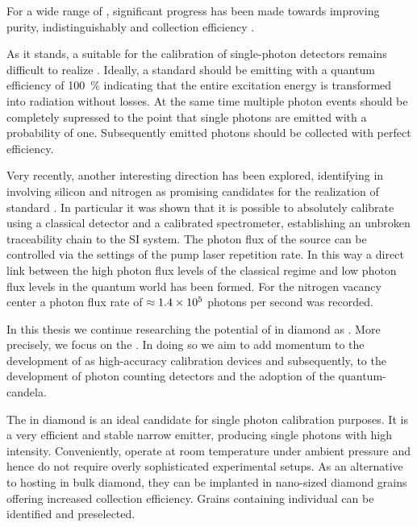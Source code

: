 	For a wide range of \spss, significant progress has been made towards improving purity, indistinguishably and collection efficiency \cite{lee2011planar, chen201199, ates2013improving, PhysRevLett.116.020401, somaschi2016near}.

	As it stands, a \sps suitable for the calibration of single-photon detectors remains difficult to realize \cite{Vaigu2017}. Ideally, a standard \sps should be emitting with a quantum efficiency of \SI{100}{\percent} indicating that the entire excitation energy is transformed into radiation without losses. At the same time multiple photon events should be completely supressed to the point that single photons are emitted with a probability of one. Subsequently emitted photons should be collected with perfect efficiency.

	Very recently, another interesting direction has been explored, identifying \ccs in \nds involving silicon \cite{Neu2012a, Neu2012b} and nitrogen \cite{doherty2013nitrogen} as promising candidates for the realization of standard \spss \cite{Rodiek2017,Vaigu2017}. In particular it was shown that it is possible to absolutely calibrate \spss using a classical detector and a calibrated spectrometer, establishing an unbroken traceability chain to the SI system. The photon flux of the source can be controlled via the settings of the pump laser repetition rate. In this way a direct link between the high photon flux levels of the classical regime and low photon flux levels in the quantum world has been formed. For the nitrogen vacancy center a photon flux rate of $\approx \num{1.4d5}$ photons per second was recorded.

	In this thesis we continue researching the potential of \ccs in diamond as \spss. More precisely, we focus on the \sivc. In doing so we aim to add momentum to the development of \sps as high-accuracy calibration devices and subsequently, to the development of photon counting detectors and the adoption of the quantum-candela.

	The \siv in diamond is an ideal candidate for single photon calibration purposes. It is a very efficient and stable narrow \lw emitter, producing single photons with high intensity. Conveniently, \sivs operate at room temperature under ambient pressure and hence do not require overly sophisticated experimental setups. As an alternative to hosting \sivs in bulk diamond, they can be implanted in nano-sized diamond grains offering increased collection efficiency. Grains containing individual \sivs can be identified and preselected.

